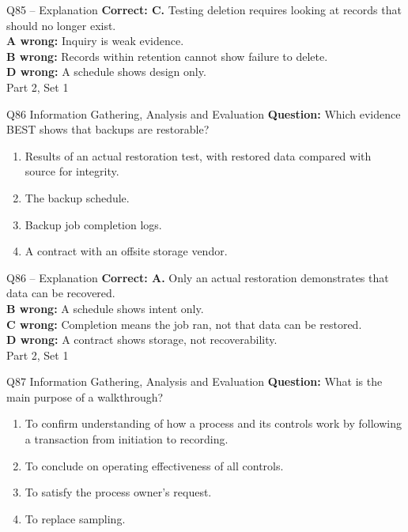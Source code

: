 \documentclass[aspectratio=169,10pt]{beamer}
\begin{document}
\begin{frame}[t]{Q85 -- Explanation}
	\footnotesize
	\textbf{Correct: C.} Testing deletion requires looking at records that should no longer exist. \\[5pt]
\textbf{A wrong:} Inquiry is weak evidence. \\[3pt]
\textbf{B wrong:} Records within retention cannot show failure to delete. \\[3pt]
\textbf{D wrong:} A schedule shows design only. \\[3pt]
	\vfill {\tiny Part 2, Set 1}
\end{frame}
\begin{frame}[t]{Q86 \hfill {\scriptsize Information Gathering, Analysis and Evaluation}}
	\small
	\textbf{Question:} Which evidence BEST shows that backups are restorable?
	\begin{enumerate}[label=\Alph*.,itemsep=1pt,topsep=3pt]
			\item Results of an actual restoration test, with restored data compared with source for integrity.
			\item The backup schedule.
			\item Backup job completion logs.
			\item A contract with an offsite storage vendor.
	\end{enumerate}
\end{frame}
\begin{frame}[t]{Q86 -- Explanation}
	\footnotesize
	\textbf{Correct: A.} Only an actual restoration demonstrates that data can be recovered. \\[5pt]
\textbf{B wrong:} A schedule shows intent only. \\[3pt]
\textbf{C wrong:} Completion means the job ran, not that data can be restored. \\[3pt]
\textbf{D wrong:} A contract shows storage, not recoverability. \\[3pt]
	\vfill {\tiny Part 2, Set 1}
\end{frame}
\begin{frame}[t]{Q87 \hfill {\scriptsize Information Gathering, Analysis and Evaluation}}
	\small
	\textbf{Question:} What is the main purpose of a walkthrough?
	\begin{enumerate}[label=\Alph*.,itemsep=1pt,topsep=3pt]
			\item To confirm understanding of how a process and its controls work by following a transaction from initiation to recording.
			\item To conclude on operating effectiveness of all controls.
			\item To satisfy the process owner's request.
			\item To replace sampling.
	\end{enumerate}
\end{frame}
\end{document}
